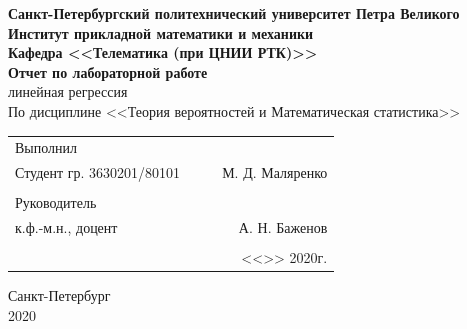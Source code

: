 \documentclass[12pt]{article}
\begin{document}
\begin{titlepage}
	\begin{center}
		\hfill \break
		{\textbf{Санкт-Петербургский политехнический университет Петра Великого}}\\
		\hfill \break
		\textbf{Институт прикладной математики и механики}\\
		 \hfill \break
		\textbf{Кафедра <<Телематика (при ЦНИИ РТК)>>}\\
		\vfill
		\large{\bfseries Отчет по лабораторной работе}\\
		\hfill \break
		\hfill \break
		\hfill \break
		\hfill \break
        \normalsize{ линейная регрессия}\\
        \hfill \break
		По дисциплине <<Теория вероятностей и Математическая статистика>>\\
		\hfill \break
		\hfill \break
	\end{center}
 
	\normalsize
	{ 
		\begin{tabular}{lp{2cm}cr}
			Выполнил &&&\\
			Студент гр. 3630201/80101&&\underline{\hspace{1.5cm}}& М. Д. Маляренко\\\\
			Руководитель&&&\\ 
			к.ф.-м.н., доцент && \underline{\hspace{1.5cm}}& А. Н. Баженов \\\\
			&&&<<\underline{\phantom{333}}>>\underline{\phantom{сентября000}}
			2020г.
		\end{tabular}
	}
\vfill

\begin{center} Санкт-Петербург \\2020 \end{center}
\end{titlepage}

\newpage

\setcounter{page}{2}
\end{document}
